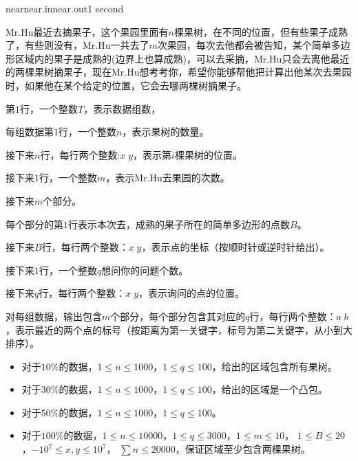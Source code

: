 \documentclass[11pt,a4paper,oneside]{article}
\begin{document}
\begin{problem}{near}{near.in}{near.out}{1 second} 

	 Mr.Hu最近去摘果子，这个果园里面有$n$棵果树，在不同的位置，但有些果子成熟了，有些则没有，Mr.Hu一共去了$m$次果园，每次去他都会被告知，某个简单多边形区域内的果子是成熟的(边界上也算成熟)，可以去采摘，Mr.Hu只会去离他最近的两棵果树摘果子，现在Mr.Hu想考考你，希望你能够帮他把计算出他某次去果园时，如果他在某个给定的位置，它会去哪两棵树摘果子。
 
    \InputFile
    
    第$1$行，一个整数$T$，表示数据组数，
	
	每组数据第$1$行，一个整数$n$，表示果树的数量。
	
	接下来$n$行，每行两个整数:$x \; y$，表示第$i$棵果树的位置。
	
	接下来$1$行，一个整数$m$，表示Mr.Hu去果园的次数。
	
	接下来$m$个部分。
	
	每个部分的第$1$行表示本次去，成熟的果子所在的简单多边形的点数$B$。
	
	接下来$B$行，每行两个整数：$x \; y$，表示点的坐标（按顺时针或逆时针给出）。
	
	接下来$1$行，一个整数$q$想问你的问题个数。
	
	接下来$q$行，每行两个整数：$x \; y$，表示询问的点的位置。

    \OutputFile

	对每组数据，输出包含$m$个部分，每个部分包含其对应的$q$行，每行两个整数：$a \; b$，表示最近的两个点的标号（按距离为第一关键字，标号为第二关键字，从小到大排序）。
 
    \Example

    \begin{example}
    \end{example}

    \Note
    
    \begin{itemize}
		\item 对于$10\%$的数据，$1 \leq n \leq 1000$，$1 \leq q \leq 100$，给出的区域包含所有果树。
		\item 对于$30\%$的数据，$1 \leq n \leq 1000$，$1 \leq q \leq 100$，给出的区域是一个凸包。
		\item 对于$50\%$的数据，$1 \leq n \leq 1000$，$1 \leq q \leq 100$。
		\item 对于$100\%$的数据，$1 \leq n \leq 10000$，$1 \leq q \leq 3000$，$1 \leq m \leq 10$， $1 \leq B \leq 20$，$-10^7 \leq x, y \leq 10^7$， $\sum n \leq 20000$，保证区域至少包含两棵果树。
    \end{itemize}

\end{problem}
\end{document}
